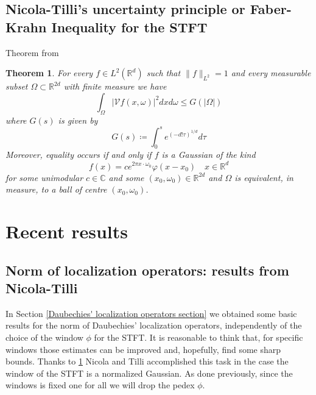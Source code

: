 \documentclass[corpo=11pt, stile=classica, tipotesi=custom,
greek, evenboxes, english]{toptesi}
\numberwithin{equation}{chapter}
\newtheorem{teo}{Theorem}[chapter] %
\theoremstyle{remark}
\newcommand{\R}{\mathbb{R}} %
\newcommand{\V}{\mathcal{V}} %
\newcommand{\C}{\mathbb{C}} %
\newcommand{\dxdo}{dxd\omega}
\begin{document}
\section{Nicola-Tilli's uncertainty principle or Faber-Krahn Inequality for the STFT}\label{section Faber-Krahn inequality fot STFT}
Theorem from \cite{nicolatilli_fk}
\begin{teo}\label{faberkrahn theorem}
	For every $f \in L^2(\R^d)$ such that $\|f\|_{L^2} = 1$ and every measurable subset $\Omega \subset \R^{2d}$ with finite measure we have
	\begin{equation*}
		\int_{\Omega}  |\V f(x,\omega)|^2 \dxdo \leq G(|\Omega|)
	\end{equation*}
	where $G(s)$ is given by
	\begin{equation}\label{G}
		G(s) \coloneqq \int_0^s e^{\left(-d!\tau\right)^{1/d}} d\tau
	\end{equation}
	Moreover, equality occurs if and only if $f$ is a Gaussian of the kind
	\begin{equation}\label{translated Gaussian}
		f(x) = c e^{2 \pi x \cdot \omega_0} \varphi(x-x_0) \quad x \in \R^d
	\end{equation}
	for some unimodular $c \in \C$ and some $(x_0,\omega_0) \in  \R^{2d}$ and $\Omega$ is equivalent, in measure, to a ball of centre $(x_0,\omega_0)$.
\end{teo}

\chapter{Recent results}\label{chapter recent results}
\section{Norm of localization operators: results from Nicola-Tilli}\label{section norm of localization operators}
{\color{blue}In Section \ref{Daubechies' localization operators section} we obtained some basic results for the norm of Daubechies' localization operators, independently of the choice of the window $\phi$ for the STFT. It is reasonable to think that, for specific windows those estimates can be improved and, hopefully, find some sharp bounds. Thanks to \ref{faberkrahn theorem} Nicola and Tilli accomplished this task in the case the window of the STFT is a normalized Gaussian. As done previously, since the windows is fixed one for all we will drop the pedex $\phi$.}
\end{document}
